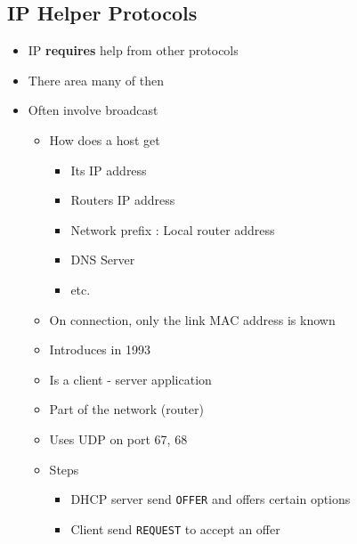 \subsection{IP Helper Protocols}
\begin{itemize}
    \item IP \textbf{requires} help from other protocols
    \item There area many of then
    \item Often involve broadcast
        \begin{itemize}
            \item How does a host get
                \begin{itemize}
                    \item Its IP address
                    \item Routers IP address
                    \item Network prefix
                    : Local router address
                    \item DNS Server
                    \item etc.
                \end{itemize}
            \item On connection, only the link MAC address is known
            \item Introduces in 1993
            \item Is a client - server application
            \item Part of the network (router)
            \item Uses UDP on port 67, 68
            \item Steps
                \begin{itemize}
                     Client sends \verb+DISCOVER+ message to broadcast address
                        \begin{itemize}
                            \item Message is received by all hosts on network
                            \item \verb+255.255.255.255+ for IP and \verb+ff:ff:ff:ff:ff:ff+ for MAC 
                        \end{itemize}
                     \item DHCP server send \verb+OFFER+ and offers certain options
                     \item Client send \verb+REQUEST+ to accept an offer

\end{itemize}
\end{itemize}
\end{itemize}
